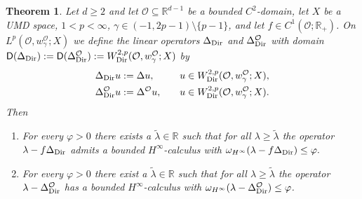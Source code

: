 \documentclass[12pt,a4paper, reqno]{amsart}
\theoremstyle{plain}
\newtheorem{theorem}{Theorem}[section]
\theoremstyle{definition}
\theoremstyle{remark}
\numberwithin{equation}{section}
\newcommand{\1}{\mathbbm{1}}
\newcommand{\R}{\ensuremath{\mathbb{R}}}
\newcommand{\calO}{\ensuremath{\mathcal{O}}}
\newcommand{\sfD}{\ensuremath{\mathsf{D}}}
\newcommand{\Dir}{\textup{Dir}}
\begin{document}
\begin{theorem}\label{Dirichlet:Laplace:Beltrami:vectorvalued:functionalcalculus}
    Let $d\geq 2$ and let $\calO\subseteq \R^{d-1}$ be a bounded $C^2$-domain, let $X$ be a UMD space, $1<p<\infty$, $\gamma\in (-1,2p-1)\setminus\{p-1\}$, and let $f \in C^1(\calO;\R_+)$. On $L^p(\calO,w_\gamma^\calO;X)$ we define the linear operators $\Delta_\Dir$ and $\Delta_\Dir^\calO$  with domain $\sfD(\Delta_\Dir):=\sfD(\Delta_\Dir^\calO):=W^{2,p}_\Dir(\calO,w_\gamma^\calO;X)$ by 
\begin{align*}
\Delta_\Dir u&:= \Delta u, \quad &&u \in W^{2,p}_\Dir(\calO,w_\gamma^\calO;X),\\ 
\Delta_\Dir^\calO u& := \Delta^\calO u, \quad &&u\in W^{2,p}_\Dir(\calO,w_\gamma^\calO;X).
\end{align*}
    Then 
    \begin{enumerate}[label=\textup{(\roman*)}]
        \item\label{it:Dirichlet:Laplace:Beltrami:vectorvalued:functionalcalculus:1} For every $\varphi>0$ there exists a $\tilde\lambda \in \R$ such that for all $\lambda\ge \tilde\lambda$ the operator $\lambda-f\Delta_\Dir$ admits a bounded $H^\infty$-calculus with $\omega_{H^\infty}(\lambda-f\Delta_\Dir)\le \varphi.$
        \item\label{it:Dirichlet:Laplace:Beltrami:vectorvalued:functionalcalculus:2} For every $\varphi>0$ there exist a  $\tilde\lambda\in \R$ such that for all $\lambda\ge \tilde \lambda$ the operator $\lambda-\Delta^\calO_\Dir$ has a bounded $H^\infty$-calculus with $\omega_{H^\infty}(\lambda-\Delta^\calO_\Dir)\le \varphi$. 
    \end{enumerate}
\end{theorem}
\end{document}
